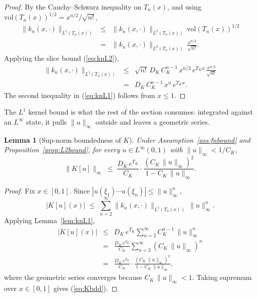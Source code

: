 \documentclass[amsthm]{autart}
\theoremstyle{plain}
\newtheorem{lemma}{Lemma}
\theoremstyle{definition}
\newcommand{\Linf}{L^\infty}
\newcommand{\Ltwo}{L^2}
\begin{document}
\begin{proof}
By the Cauchy--Schwarz inequality on $T_n(x)$, and using $\mathrm{vol}(T_n(x))^{1/2} = x^{n/2}/\sqrt{n!}$,
\begin{eqnarray}
\|k_n(x,\cdot)\|_{L^1(T_n(x))} &\le& \|k_n(x,\cdot)\|_{\Ltwo(T_n(x))}\, \mathrm{vol}(T_n(x))^{1/2} \nonumber \\
&=& \|k_n(x,\cdot)\|_{\Ltwo(T_n(x))}\,\frac{x^{n/2}}{\sqrt{n!}}.
\label{eq:L1_CS}
\end{eqnarray}
Applying the slice bound (\ref{eq:knL2}),
\begin{eqnarray}
\|k_n(x,\cdot)\|_{L^1(T_n(x))} &\le& \sqrt{n!}\, D_K\, C_K^{n-1}\, x^{n/2}\, e^{\Upsilon_K x}\,\frac{x^{n/2}}{\sqrt{n!}} \nonumber \\
&=& D_K\, C_K^{n-1}\, x^n\, e^{\Upsilon_K x}.
\label{eq:L1_applied}
\end{eqnarray}
The second inequality in (\ref{eq:knL1}) follows from $x \le 1$.
\end{proof}

The $L^1$ kernel bound is what the rest of the section consumes: integrated against an $\Linf$ state, it pulls $\|u\|_\infty$ outside and leaves a geometric series.

\begin{lemma}[Sup-norm boundedness of $K$]\label{lem:Kbdd}
Under Assumption~\ref{ass:fnbound} and Proposition~\ref{prop:L2bound}, for every $u \in \Linf(0,1)$ with $\|u\|_\infty < 1/C_K$,
\begin{equation}
\|K[u]\|_\infty \;\le\; \frac{D_K\, e^{\Upsilon_K}}{C_K}\cdot \frac{(C_K\,\|u\|_\infty)^2}{1 - C_K\,\|u\|_\infty}.
\label{eq:Kbdd}
\end{equation}
\end{lemma}

\begin{proof}
Fix $x \in [0,1]$. Since $|u(\xi_1)\cdots u(\xi_n)| \le \|u\|_\infty^n$,
\begin{equation}
|K[u](x)| \;\le\; \sum_{n=2}^\infty \|k_n(x,\cdot)\|_{L^1(T_n(x))}\,\|u\|_\infty^n.
\label{eq:K_sum}
\end{equation}
Applying Lemma~\ref{lem:knL1},
\begin{eqnarray}
|K[u](x)| &\le& D_K\, e^{\Upsilon_K}\sum_{n=2}^\infty C_K^{n-1}\,\|u\|_\infty^n \nonumber \\
&=& \frac{D_K\, e^{\Upsilon_K}}{C_K}\sum_{n=2}^\infty (C_K\,\|u\|_\infty)^n \nonumber \\
&=& \frac{D_K\, e^{\Upsilon_K}}{C_K}\cdot\frac{(C_K\,\|u\|_\infty)^2}{1 - C_K\,\|u\|_\infty},
\label{eq:K_geom}
\end{eqnarray}
where the geometric series converges because $C_K\,\|u\|_\infty < 1$. Taking supremum over $x \in [0,1]$ gives (\ref{eq:Kbdd}).
\end{proof}
\end{document}
